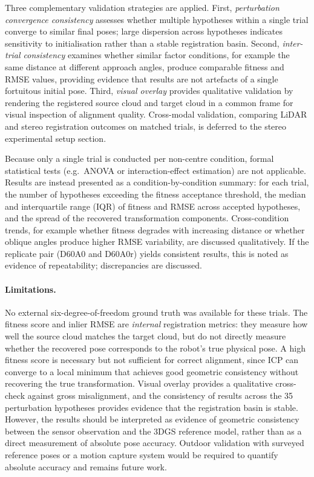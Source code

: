 Three complementary validation strategies are applied. First, \emph{perturbation convergence consistency} assesses whether multiple hypotheses within a single trial converge to similar final poses; large dispersion across hypotheses indicates sensitivity to initialisation rather than a stable registration basin. Second, \emph{inter-trial consistency} examines whether similar factor conditions, for example the same distance at different approach angles, produce comparable fitness and RMSE values, providing evidence that results are not artefacts of a single fortuitous initial pose. Third, \emph{visual overlay} provides qualitative validation by rendering the registered source cloud and target cloud in a common frame for visual inspection of alignment quality. Cross-modal validation, comparing LiDAR and stereo registration outcomes on matched trials, is deferred to the stereo experimental setup section.

Because only a single trial is conducted per non-centre condition, formal statistical tests (e.g.\ ANOVA or interaction-effect estimation) are not applicable. Results are instead presented as a condition-by-condition summary: for each trial, the number of hypotheses exceeding the fitness acceptance threshold, the median and interquartile range (IQR) of fitness and RMSE across accepted hypotheses, and the spread of the recovered transformation components. Cross-condition trends, for example whether fitness degrades with increasing distance or whether oblique angles produce higher RMSE variability, are discussed qualitatively. If the replicate pair (D60A0 and D60A0r) yields consistent results, this is noted as evidence of repeatability; discrepancies are discussed.

\paragraph{Limitations.}
No external six-degree-of-freedom ground truth was available for these trials. The fitness score and inlier RMSE are \emph{internal} registration metrics: they measure how well the source cloud matches the target cloud, but do not directly measure whether the recovered pose corresponds to the robot's true physical pose. A high fitness score is necessary but not sufficient for correct alignment, since ICP can converge to a local minimum that achieves good geometric consistency without recovering the true transformation. Visual overlay provides a qualitative cross-check against gross misalignment, and the consistency of results across the 35 perturbation hypotheses provides evidence that the registration basin is stable. However, the results should be interpreted as evidence of geometric consistency between the sensor observation and the 3DGS reference model, rather than as a direct measurement of absolute pose accuracy. Outdoor validation with surveyed reference poses or a motion capture system would be required to quantify absolute accuracy and remains future work.